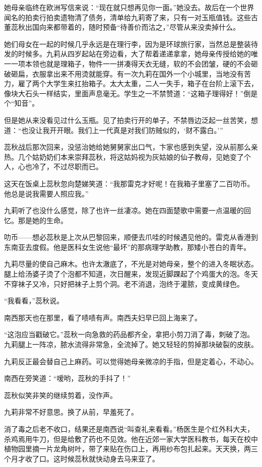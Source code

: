 \par 她母亲临终在欧洲写信来说：“现在就只想再见你一面。”她没去。故后在一个世界闻名的拍卖行拍卖遗物清了债务，清单给九莉寄了来，只有一对玉瓶值钱。这些古董蕊秋出国向来都带着的，随时预备“待善价而沽之，”尽管从来没卖掉什么。
\par 她们母女在一起的时候几乎永远是在理行李，因为是环球旅行家，当然总是整装待发的时候多。九莉从四岁起站在旁边看，大了帮着递递拿拿，她母亲传授给她的唯一一项本领也就是理箱子，物件一一拼凑得天衣无缝，软的不会团皱，硬的不会砸破砸扁，衣服拿出来不用烫就能穿。有一次九莉在国外一个小城里，当地没有苦力，雇了两个大学生来扛抬箱子。太大太重，二人一失手，箱子在台阶上滚下去，像块大石头一样结实，里面声息毫无。学生之一不禁赞道：“这箱子理得好！”倒是个“知音”。
\par 但是她从来没看见过什么玉瓶。见了拍卖行开的单子，不禁唇边泛起一丝苦笑，想道：“也没让我开开眼。我们上一代真是对我们防贼似的，‘财不露白。'”
\par 蕊秋战后那次回来，没惩治她给她舅舅家出口气，卞家也感到失望，没从前那么亲热。几个姑奶奶们本来崇拜蕊秋，将这姑妈视为灰姑娘的仙子教母，见她变了个人，心也冷了，不过尽职而已。
\par 这天在饭桌上蕊秋忽向楚娣笑道：“我那雷克才好呢！在我箱子里塞了二百叻币。他总是说我需要人照应我。”
\par 九莉听了也没什么感觉，除了也许一丝凄凉。她在四面楚歌中需要一点温暖的回忆。那是她的生命。
\par 叻币——想必蕊秋是上次从巴黎回来，顺便去爪哇的时候遇见他的。雷克从香港到东南亚去度假。他是医科女生说他“最坏”的那病理学助教，那矮小苍白的青年。
\par 九莉尽量的使自己麻木。也许太澈底了，不光是对她母亲，整个的进入冬眠状态。腿上给汤婆子烫了个泡都不知道，次日醒来，发现近脚踝起了个鸡蛋大的泡。冬天不穿袜子又冷，只好把袜子上剪个洞。老不消退，泡终于灌脓，变成黄绿色。
\par “我看看，”蕊秋说。
\par 南西那天也在那里，看了啧啧有声。南西夫妇早已回上海来了。
\par “这泡应当戳破它。”蕊秋一向急救的药品都齐全，拿把小剪刀消了毒，刺破了泡。九莉腿上一阵凉，脓水流得非常急，全流掉了。她又轻轻的剪掉那块破裂的皮肤。
\par 九莉反正最会替自己上麻药。可以觉得她母亲微凉的手指，但是定着心，不动心。
\par 南西在旁笑道：“嗳哟，蕊秋的手抖了！”
\par 蕊秋似笑非笑的继续剪着，没作声。
\par 九莉非常不好意思。换了从前，早羞死了。
\par 消了毒之后老不收口，结果还是南西说“叫查礼来看看。”杨医生是个红外科大夫，杀鸡焉用牛刀，但是给敷了药也不见效。他在近郊一家大学医科教书，每天在校中植物园里摘一片龙角树叶，带了来贴在伤口上，再用纱布包扎起来。天天换，两三个月才收了口。这时候蕊秋就快动身去马来亚了。
